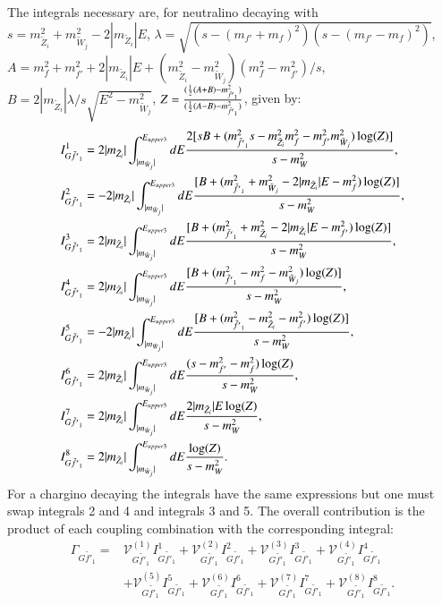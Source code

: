 \documentclass[final,3p,times]{elsarticle}
\begin{document}
The integrals necessary are, for neutralino decaying with \\ $s = m_{\tilde{Z}_i}^2 + m_{\tilde{W}_j}^2 -2|m_{\tilde{Z}_i}|E$,  $\lambda = \sqrt{(s-(m_{f'}+m_{f})^2)(s-(m_{f'}-m_{f})^2)}$, $A = m_{f}^2 + m_{f'}^2 +2|m_{\tilde{Z}_i}|E + (m_{\tilde{Z}_i}^2 - m_{\tilde{W}_j}^2)(m_{f}^2 - m_{f'}^2)/s$, $B = 2|m_{\tilde{Z}_i}|\lambda/s \sqrt{E^2 - m_{\tilde{W}_j}^2} $, $Z = {(\frac{1}{2}(A+B) - m_{\tilde{f'}_1}^2) \over (\frac{1}{2}(A-B) - m_{\tilde{f'}_1}^2)}$, given by:
\begin{align}
I_{G \tilde{f'}_1}^{1} &= 2|m_{\tilde{Z}_i}| \int_{|m_{\tilde{W}_j}|}^{E_{upper3}} dE {2[sB + (m_{\tilde{f'}_1}^2 s - m_{\tilde{Z}_i}^2 m_{f}^2 - m_{f'}^2 m_{\tilde{W}_j}^2)\log(Z)] \over s - m_{W}^2}, \\
I_{G \tilde{f'}_1}^{2} &= -2|m_{\tilde{Z}_i}| \int_{|m_{\tilde{W}_j}|}^{E_{upper3}} dE {[B + (m_{\tilde{f'}_1}^2 + m_{\tilde{W}_j}^2 - 2|m_{\tilde{Z}_i}|E - m_{f}^2)\log(Z)] \over s - m_{W}^2}, \\
I_{G \tilde{f'}_1}^{3} &= 2|m_{\tilde{Z}_i}| \int_{|m_{\tilde{W}_j}|}^{E_{upper3}} dE {[B + (m_{\tilde{f'}_1}^2 + m_{\tilde{Z}_i}^2 - 2|m_{\tilde{Z}_i}|E - m_{f'}^2)\log(Z)] \over s - m_{W}^2}, \\
I_{G \tilde{f'}_1}^{4} &= 2|m_{\tilde{Z}_i}| \int_{|m_{\tilde{W}_j}|}^{E_{upper3}} dE {[B + (m_{\tilde{f'}_1}^2 - m_{f}^2 - m_{\tilde{W}_j}^2)\log(Z)] \over s - m_{W}^2}, \\
I_{G \tilde{f'}_1}^{5} &= -2|m_{\tilde{Z}_i}| \int_{|m_{\tilde{W}_j}|}^{E_{upper3}} dE {[B + (m_{\tilde{f'}_1}^2 - m_{\tilde{Z}_i}^2 - m_{f'}^2)\log(Z)] \over s - m_{W}^2}, \\
I_{G \tilde{f'}_1}^{6} &= 2|m_{\tilde{Z}_i}| \int_{|m_{\tilde{W}_j}|}^{E_{upper3}} dE {(s-m_{f'}^2-m_{f}^2)\log(Z) \over s - m_{W}^2}, \\
I_{G \tilde{f'}_1}^{7} &= 2|m_{\tilde{Z}_i}| \int_{|m_{\tilde{W}_j}|}^{E_{upper3}} dE {2|m_{\tilde{Z}_i}|E \log(Z) \over s - m_{W}^2}, \\
I_{G \tilde{f'}_1}^{8} &= 2|m_{\tilde{Z}_i}| \int_{|m_{\tilde{W}_j}|}^{E_{upper3}} dE {\log(Z) \over s - m_{W}^2}.
\end{align}
For a chargino decaying the integrals have the same expressions but one must
swap integrals 2 and 4 and integrals 3 and 5. The overall contribution is the product of each coupling combination with the corresponding integral:
\begin{equation}
\begin{aligned}
\Gamma_{G \tilde{f'}_1} = & \mathcal{V}_{G \tilde{f'}_1}^{(1)} I_{G \tilde{f'}_1}^{1} + \mathcal{V}_{G \tilde{f'}_1}^{(2)} I_{G \tilde{f'}_1}^{2} + \mathcal{V}_{G \tilde{f'}_1}^{(3)} I_{G \tilde{f'}_1}^{3} + \mathcal{V}_{G \tilde{f'}_1}^{(4)} I_{G \tilde{f'}_1}^{4} \\ & + \mathcal{V}_{G \tilde{f'}_1}^{(5)} I_{G \tilde{f'}_1}^{5} + \mathcal{V}_{G \tilde{f'}_1}^{(6)} I_{G \tilde{f'}_1}^{6} + \mathcal{V}_{G \tilde{f'}_1}^{(7)} I_{G \tilde{f'}_1}^{7} + \mathcal{V}_{G \tilde{f'}_1}^{(8)} I_{G \tilde{f'}_1}^{8}.
\end{aligned}
\end{equation}
\end{document}
